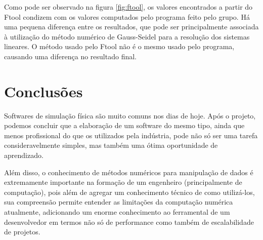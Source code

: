 \documentclass[paper=a4, fontsize=11pt]{scrartcl}
\begin{document}
Como pode ser observado na figura \ref{fig:ftool}, os valores encontrados a partir do Ftool condizem com os valores computados pelo programa feito pelo grupo. Há uma pequena diferença entre os resultados, que pode ser principalmente associada à utilização do método numérico de Gauss-Seidel para a resolução dos sistemas lineares. O método usado pelo Ftool não é o mesmo usado pelo programa, causando uma diferença no resultado final.

\section{Conclusões}

Softwares de simulação física são muito comuns nos dias de hoje. Após o projeto, podemos concluir que a elaboração de um software do mesmo tipo, ainda que menos profissional do que os utilizados pela indústria, pode não só ser uma tarefa consideravelmente simples, mas também uma ótima oportunidade de aprendizado.

Além disso, o conhecimento de métodos numéricos para manipulação de dados é extremamente importante na formação de um engenheiro (principalmente de computação), pois além de agregar um conhecimento técnico de como utilizá-los, sua compreensão permite entender as limitações da computação numérica atualmente, adicionando um enorme conhecimento ao ferramental de um desenvolvedor em termos não só de performance como também de escalabilidade de projetos.

{}

\end{document}

